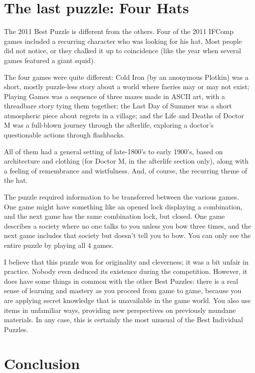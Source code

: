 \section{The last puzzle: Four Hats}

The 2011 Best Puzzle is different from the others. Four of the 2011 IFComp games included a recurring character who was looking for his hat. Most people did not notice, or they chalked it up to coincidence (like the year when several games featured a giant squid). 

The four games were quite different: Cold Iron (by an anonymous Plotkin) was a short, mostly puzzle-less story about a world where faeries may or may not exist; Playing Games was a sequence of three mazes made in ASCII art, with a threadbare story tying them together; the Last Day of Summer was a short atmospheric piece about regrets in a village; and the Life and Deaths of Doctor M was a full-blown journey through the afterlife, exploring a doctor’s questionable actions through flashbacks.

All of them had a general setting of late-1800’s to early 1900’s, based on architecture and clothing (for Doctor M, in the afterlife section only), along with a feeling of remembrance and wistfulness. And, of course, the recurring theme of the hat.

The puzzle required information to be transferred between the various games. One game might have something like an opened lock displaying a combination, and the next game has the same combination lock, but closed. One game describes a society where no one talks to you unless you bow three times, and the next game includes that society but doesn’t tell you to bow. You can only see the entire puzzle by playing all 4 games.

I believe that this puzzle won for originality and cleverness; it was a bit unfair in practice. Nobody even deduced its existence during the competition. However, it does have some things in common with the other Best Puzzles: there is a real sense of learning and mastery as you proceed from game to game, because you are applying secret knowledge that is unavailable in the game world. You also use items in unfamiliar ways, providing new perspectives on previously mundane materials. In any case, this is certainly the most unusual of the Best Individual Puzzles.

\section{Conclusion}

